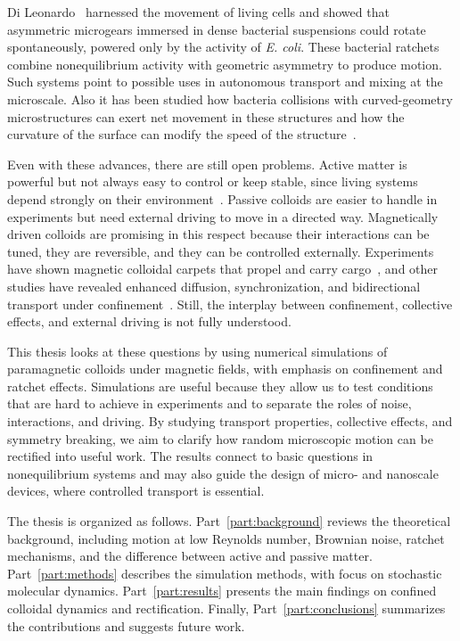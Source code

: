 Di Leonardo~\cite{di2010bacterial} harnessed the movement of living cells and showed that asymmetric microgears immersed in dense bacterial suspensions could rotate spontaneously, powered only by the activity of \textit{E. coli}. These bacterial ratchets combine nonequilibrium activity with geometric asymmetry to produce motion. Such systems point to possible uses in autonomous transport and mixing at the microscale. Also it has been studied how bacteria collisions with curved-geometry microstructures can exert net movement in these structures and how the curvature of the surface can modify the speed of the structure~\cite{pellicciotta2025wall}.

Even with these advances, there are still open problems. Active matter is powerful but not always easy to control or keep stable, since living systems depend strongly on their environment~\cite{bechinger2016active}. Passive colloids are easier to handle in experiments but need external driving to move in a directed way. Magnetically driven colloids are promising in this respect because their interactions can be tuned, they are reversible, and they can be controlled externally. Experiments have shown magnetic colloidal carpets that propel and carry cargo~\cite{martinez2015magnetic}, and other studies have revealed enhanced diffusion, synchronization, and bidirectional transport under confinement~\cite{tierno2012depinning, straube2014tunable, massana2020emergent, ostinato2024magnetically}. Still, the interplay between confinement, collective effects, and external driving is not fully understood.

This thesis looks at these questions by using numerical simulations of paramagnetic colloids under magnetic fields, with emphasis on confinement and ratchet effects. Simulations are useful because they allow us to test conditions that are hard to achieve in experiments and to separate the roles of noise, interactions, and driving. By studying transport properties, collective effects, and symmetry breaking, we aim to clarify how random microscopic motion can be rectified into useful work. The results connect to basic questions in nonequilibrium systems and may also guide the design of micro- and nanoscale devices, where controlled transport is essential.

The thesis is organized as follows. Part~\ref{part:background} reviews the theoretical background, including motion at low Reynolds number, Brownian noise, ratchet mechanisms, and the difference between active and passive matter. Part~\ref{part:methods} describes the simulation methods, with focus on stochastic molecular dynamics. Part~\ref{part:results} presents the main findings on confined colloidal dynamics and rectification. Finally, Part~\ref{part:conclusions} summarizes the contributions and suggests future work.
